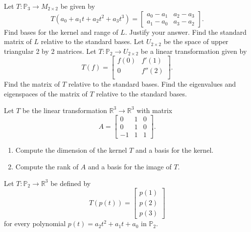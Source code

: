 \documentclass[12pt,letterpaper]{article}
\begin{document}
\begin{enumerate}
\Problem Let  $T \colon \mathbb{P}_3 \rightarrow M_{2\times 2}$ be given by
			$$ T(a_0 + a_1 t + a_2 t^2 + a_3 t^3) = \begin{bmatrix} a_0-a_1 & a_2 - a_3 \\ a_1-a_0 & a_3 - a_2 \end{bmatrix}. $$ Find bases for the kernel and range of $L$.  Justify your answer.  Find the standard matrix of $L$ relative to the standard bases.
\Problem Let $U_{2 \times 2}$ be the space of upper triangular 2 by 2 matrices. Let $T : \mathbb{P}_2 \to U_{2 \times 2}$ be a linear transformation given by $$T(f) = \begin{bmatrix} f(0) & f'(1)\\  0 & f''(2)\\ \end{bmatrix}.$$   Find the matrix of $T$ relative to the standard bases.  Find the eigenvalues and eigenspaces of the matrix of $T$ relative to the standard bases.


\Problem Let $T$ be the linear transformation $\mathbb R^3 \to \mathbb R^3$ with matrix
	\[
	A = \begin{bmatrix}
	0 &
	1 &
	0 \\
	
	0 &
	1 &
	0 \\
	
	-1 &
	1 &
	1
	\end{bmatrix}.
	\]
	
	\begin{enumerate}
		\item Compute the dimension of the kernel $T$ and a basis for the kernel.
		
		\item Compute the rank of $A$ and a basis for the image of $T$.
	\end{enumerate}
	
	
\Problem Let $T:\mathbb{P}_2\to\mathbb{R}^3$ be defined by $$T(p(t)) = \begin{bmatrix}p(1)\\p(2)\\p(3)\end{bmatrix}$$ for every polynomial $p(t) = a_2t^2 + a_1t + a_0$ in $\mathbb{P}_2$.
	

\end{enumerate}
\end{document}
